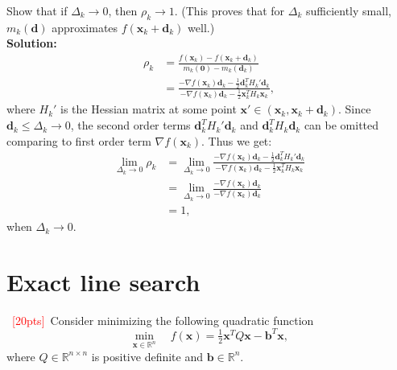 \documentclass[10pt]{article}
\begin{document}
Show that if $\Delta_{k}\to 0$, then $\rho_{k}\to1$. (This proves that for $\Delta_{k}$ sufficiently small, $m_{k}(\bm{d})$ approximates $f(\bm{x}_{k} + \bm{d}_{k})$ well.)\\
\textbf{Solution:}
\begin{align*}
	\rho_{k} &= \frac{f(\bm{x}_{k}) - f(\bm{x}_{k} + \bm{d}_{k}) }{m_{k}(\bm{0}) - m_{k}(\bm{d}_{k})}\\
	&= \frac{-\nabla f(\bm{x}_{k}) \bm{d}_k -\frac{1}{2} \bm{d}_k^TH_k'\bm{d}_k}{-\nabla f(\bm{x}_{k}) \bm{d}_k - \frac{1}{2}\bm{x}_{k}^TH_k\bm{x}_{k}},
\end{align*}
where $H_k'$ is the Hessian matrix at some point $\bm{x}' \in (\bm{x}_k, \bm{x}_k+\bm{d}_k)$. Since $\bm{d}_k\le \Delta_k\rightarrow 0$, the second order terms  $\bm{d}_k^TH_k'\bm{d}_k$ and $ \bm{d}_k^TH_k\bm{d}_k$ can be omitted comparing to first order term $\nabla f(\bm{x}_{k})$. Thus we get:
	\begin{align*}
		\lim_{\Delta_k\rightarrow0} \rho_{k} & = \lim_{\Delta_k\rightarrow0} \frac{-\nabla f(\bm{x}_{k}) \bm{d}_k -\frac{1}{2} \bm{d}_k^TH_k'\bm{d}_k}{-\nabla f(\bm{x}_{k}) \bm{d}_k - \frac{1}{2}\bm{x}_{k}^TH_k\bm{x}_{k}}\\
		&= \lim_{\Delta_k\rightarrow0} \frac{-\nabla f(\bm{x}_{k}) \bm{d}_k}{-\nabla f(\bm{x}_{k}) \bm{d}_k}\\
		&= 1,
	\end{align*}
	when $\Delta_{k}\to 0$.
\section{Exact line search}
~\textcolor{red}{[20pts]}~Consider minimizing the following quadratic function
\begin{equation}\label{eq: quadratic}
	\min_{\bm{x}\in\mathbb{R}^{n}}\quad f(\bm{x}) = \tfrac{1}{2}\bm{x}^{T}Q\bm{x} - \bm{b}^{T}\bm{x},
\end{equation}
where $Q\in\mathbb{R}^{n\times n}$ is positive definite and $\bm{b} \in \mathbb{R}^{n}$.
\end{document}
